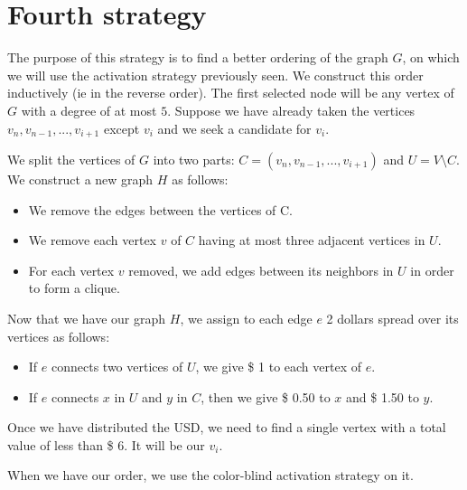 \section{Fourth strategy}

The purpose of this strategy is to find a better ordering of the graph $G$, on which we will use the activation strategy previously seen. We construct this order inductively (ie in the reverse order). The first selected node will be any vertex of $G$ with a degree of at most $5$.
Suppose we have already taken the vertices $v_{n}, v_{n-1}, ..., v_{i+1}$ except $v_{i}$ and we seek a candidate for $v_{i}$.

We split the vertices of $G$ into two parts: $C = (v_{n}, v_{n-1}, ..., v_{i+1})$ and $U = V \setminus C$.
We construct a new graph $H$ as follows:
\begin{itemize}
\item We remove the edges between the vertices of C.
\item We remove each vertex $v$ of $C$ having at most three adjacent vertices in $U$.
\item For each vertex $v$ removed, we add edges between its neighbors in $U$ in order to form a clique.
\end{itemize}

Now that we have our graph $H$, we assign to each edge $e$ 2 dollars spread over its vertices as follows:
\begin{itemize}
\item If $e$ connects two vertices of $U$, we give \$ 1 to each vertex of $e$.
\item If $e$ connects $x$ in $U$ and $y$ in $C$, then we give \$ 0.50 to $x$ and \$ 1.50 to $y$.
\end{itemize}

Once we have distributed the USD, we need to find a single vertex with a total value of less than \$ 6.
It will be our $v_{i}$.

When we have our order, we use the color-blind activation strategy on it.